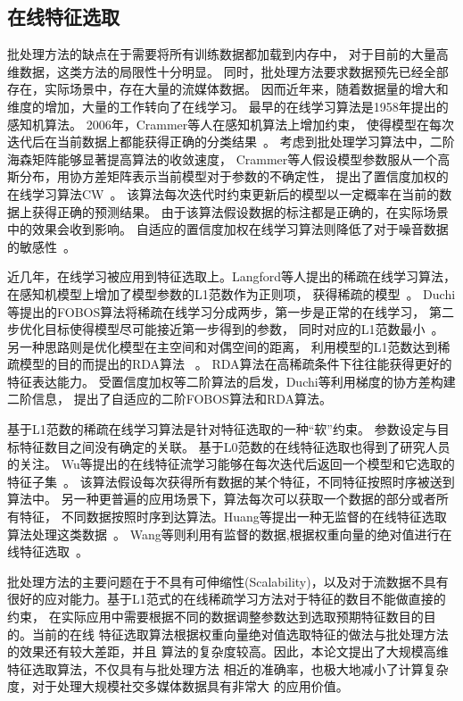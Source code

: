 \subsection{在线特征选取}
批处理方法的缺点在于需要将所有训练数据都加载到内存中，
对于目前的大量高维数据，这类方法的局限性十分明显。
同时，批处理方法要求数据预先已经全部存在，实际场景中，存在大量的流媒体数据。
因而近年来，随着数据量的增大和维度的增加，大量的工作转向了在线学习。
最早的在线学习算法是1958年提出的感知机算法。
2006年，Crammer等人在感知机算法上增加约束，
使得模型在每次迭代后在当前数据上都能获得正确的分类结果~\cite{crammer2006online}。
考虑到批处理学习算法中，二阶海森矩阵能够显著提高算法的收敛速度，
Crammer等人假设模型参数服从一个高斯分布，用协方差矩阵表示当前模型对于参数的不确定性，
提出了置信度加权的在线学习算法CW~\cite{crammer2009multi}。
该算法每次迭代时约束更新后的模型以一定概率在当前的数据上获得正确的预测结果。
由于该算法假设数据的标注都是正确的，在实际场景中的效果会收到影响。
自适应的置信度加权在线学习算法则降低了对于噪音数据的敏感性~\cite{crammer2009adaptive}。

近几年，在线学习被应用到特征选取上。Langford等人提出的稀疏在线学习算法，
在感知机模型上增加了模型参数的L1范数作为正则项，
获得稀疏的模型~\cite{langford2009sparse}。
Duchi等提出的FOBOS算法将稀疏在线学习分成两步，第一步是正常的在线学习，
第二步优化目标使得模型尽可能接近第一步得到的参数，
同时对应的L1范数最小~\cite{duchi2009efficient}。
另一种思路则是优化模型在主空间和对偶空间的距离，
利用模型的L1范数达到稀疏模型的目的而提出的RDA算法~\cite{xiao2010dual} 。
RDA算法在高稀疏条件下往往能获得更好的特征表达能力。
受置信度加权等二阶算法的启发，Duchi等利用梯度的协方差构建二阶信息，
提出了自适应的二阶FOBOS算法和RDA算法。

基于L1范数的稀疏在线学习算法是针对特征选取的一种“软”约束。
参数设定与目标特征数目之间没有确定的关联。
基于L0范数的在线特征选取也得到了研究人员的关注。
Wu等提出的在线特征流学习能够在每次迭代后返回一个模型和它选取的特征子集~\cite{wu2010online}。
该算法假设每次获得所有数据的某个特征，不同特征按照时序被送到算法中。
另一种更普遍的应用场景下，算法每次可以获取一个数据的部分或者所有特征，
不同数据按照时序到达算法。Huang等提出一种无监督的在线特征选取算法处理这类数据~\cite{huang2015unsupervised}。
Wang等则利用有监督的数据,根据权重向量的绝对值进行在线特征选取~\cite{wang2014online}。

批处理方法的主要问题在于不具有可伸缩性(Scalability)，以及对于流数据不具有
很好的应对能力。基于L1范式的在线稀疏学习方法对于特征的数目不能做直接的约束，
在实际应用中需要根据不同的数据调整参数达到选取预期特征数目的目的。当前的在线
特征选取算法根据权重向量绝对值选取特征的做法与批处理方法的效果还有较大差距，并且
算法的复杂度较高。因此，本论文提出了大规模高维特征选取算法，不仅具有与批处理方法
相近的准确率，也极大地减小了计算复杂度，对于处理大规模社交多媒体数据具有非常大
的应用价值。


